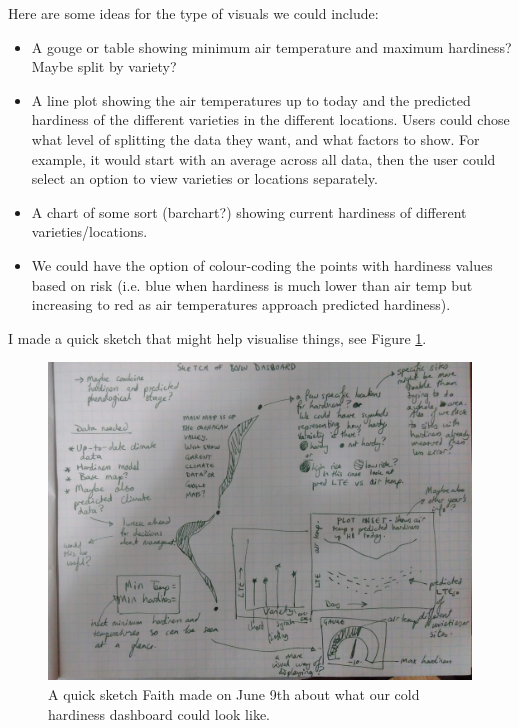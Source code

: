 \documentclass[11pt,letter]{article}
\begin{document}
Here are some ideas for the type of visuals we could include:
\begin{itemize}
	\item A gouge or table showing minimum air temperature and maximum hardiness? Maybe split by variety?
	\item A line plot showing the air temperatures up to today and the predicted hardiness of the different varieties in the different locations. Users could chose what level of splitting the data they want, and what factors to show. For example, it would start with an average across all data, then the user could select an option to view varieties or locations separately. 
	\item A chart of some sort (barchart?) showing current hardiness of different varieties/locations. 
	\item We could have the option of colour-coding the points with hardiness values based on risk (i.e. blue when hardiness is much lower than air temp but increasing to red as air temperatures approach predicted hardiness).  
\end{itemize}
I made a quick sketch that might help visualise things, see Figure \ref{fig:DashboardSketchFJ}. 

\begin{figure}[H]
  \includegraphics[width=\linewidth]{DashboardSketchFJ.jpg}
  \caption{A quick sketch Faith made on June 9th about what our cold hardiness dashboard could look like.}
  \label{fig:DashboardSketchFJ}
\end{figure}
\end{document}
